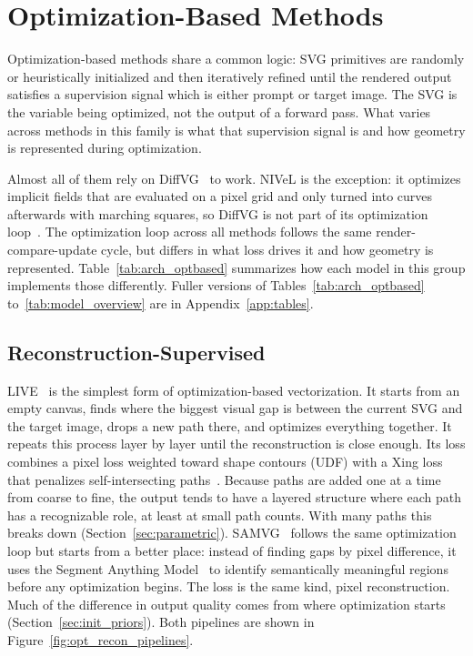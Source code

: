 \section{Optimization-Based Methods}
\label{sec:optimization}

Optimization-based methods share a common logic: SVG
primitives are randomly or heuristically
initialized and then iteratively refined until the rendered
output satisfies a supervision signal which is either prompt or target image.
The SVG is the variable being optimized, not the output of a forward pass.
What varies across methods in this family is what that
supervision signal is and how geometry is represented
during optimization.

Almost all of them rely on DiffVG~\cite{liDifferentiableVectorGraphics2020a} to work. 
NIVeL is the exception: it optimizes implicit fields that are evaluated on a pixel grid 
and only turned into curves afterwards with marching squares, so DiffVG is not part of 
its optimization loop~\cite{thamizharasanNIVeLNeuralImplicit2024}.
The optimization loop across all methods 
follows the same render-compare-update cycle, 
but differs in what loss drives it and how geometry is represented.
Table~\ref{tab:arch_optbased} summarizes how each 
model in this group implements those differently. 
Fuller versions of Tables~\ref{tab:arch_optbased} 
to~\ref{tab:model_overview} are in Appendix~\ref{app:tables}.

\subsection{Reconstruction-Supervised}

LIVE~\cite{maLayerwiseImageVectorization2022} is the simplest form of optimization-based vectorization. 
It starts from an empty canvas, finds where the biggest visual gap is between the current SVG and the target image, 
drops a new path there, and optimizes everything together. It repeats this process layer by layer until the reconstruction is close enough. 
Its loss combines a pixel loss weighted toward shape contours (UDF) with a Xing loss that penalizes self-intersecting paths~\cite{maLayerwiseImageVectorization2022}. 
Because paths are added one at a time from coarse to fine, the output tends to have a layered structure where each path has a recognizable role, 
at least at small path counts. With many paths this breaks down (Section~\ref{sec:parametric}). 
SAMVG~\cite{zhuSAMVGMultistageImage2023} follows the same optimization loop but starts from a better place: instead of finding gaps by 
pixel difference, it uses the Segment Anything Model~\cite{kirillovSegmentAnything2023} to identify semantically meaningful 
regions before any optimization begins. The loss is the same kind, pixel reconstruction. Much of the difference in output quality comes 
from where optimization starts (Section~\ref{sec:init_priors}). Both pipelines are shown in Figure~\ref{fig:opt_recon_pipelines}.

